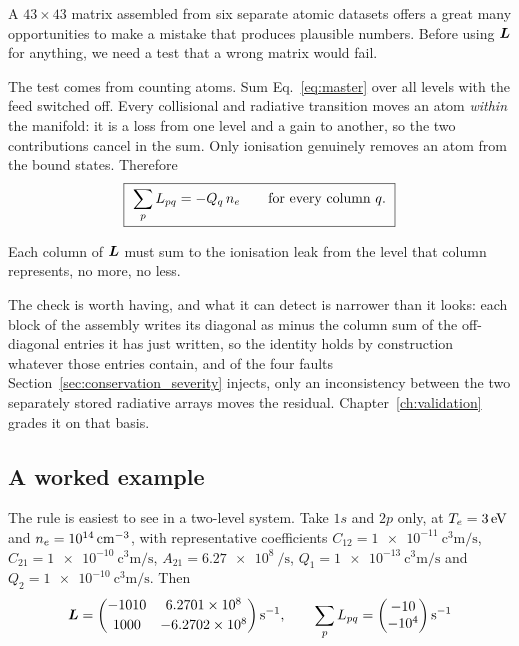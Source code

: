 A $43\times43$ matrix assembled from six separate atomic datasets offers a great
many opportunities to make a mistake that produces plausible numbers. Before
using $\bm{L}$ for anything, we need a test that a wrong matrix would fail.

The test comes from counting atoms. Sum Eq.~\eqref{eq:master} over all levels
with the feed switched off. Every collisional and radiative transition moves an
atom \emph{within} the manifold: it is a loss from one level and a gain to
another, so the two contributions cancel in the sum. Only ionisation genuinely
removes an atom from the bound states. Therefore
\begin{equation}
  \boxed{\ \sum_{p} L_{pq} = -Q_q\,n_e \qquad \text{for every column } q.\ }
  \label{eq:conservation}
\end{equation}

\noindent Each column of $\bm{L}$ must sum to the ionisation leak from the level
that column represents, no more, no less.

The check is worth having, and what it can detect is narrower than it looks:
each block of the
assembly writes its diagonal as minus the column sum of the off-diagonal
entries it has just written, so the identity holds by construction whatever
those entries contain, and of the four faults
Section~\ref{sec:conservation_severity} injects, only an inconsistency between
the two separately stored radiative arrays moves the residual.
Chapter~\ref{ch:validation} grades it on that basis.

\subsection{A worked example}

The rule is easiest to see in a two-level system. Take $1s$ and $2p$ only, at
$T_e = \SI{3}{\electronvolt}$ and $n_e = \SI{e14}{\per\cubic\centi\metre}$, with
representative coefficients $C_{12} = \SI{1e-11}{\cubic\centi\metre\per\second}$,
$C_{21} = \SI{1e-10}{\cubic\centi\metre\per\second}$,
$A_{21} = \SI{6.27e8}{\per\second}$,
$Q_1 = \SI{1e-13}{\cubic\centi\metre\per\second}$ and
$Q_2 = \SI{1e-10}{\cubic\centi\metre\per\second}$. Then
\begin{equation}
  \bm{L} =
  \begin{pmatrix}
    -1010 & 6.2701\times10^{8}\\[2pt]
    1000  & -6.2702\times10^{8}
  \end{pmatrix}\si{\per\second},
  \qquad
  \sum_p L_{pq} = \begin{pmatrix}-10 \\ -10^{4}\end{pmatrix}\si{\per\second}
  \label{eq:toy_matrix}
\end{equation}

